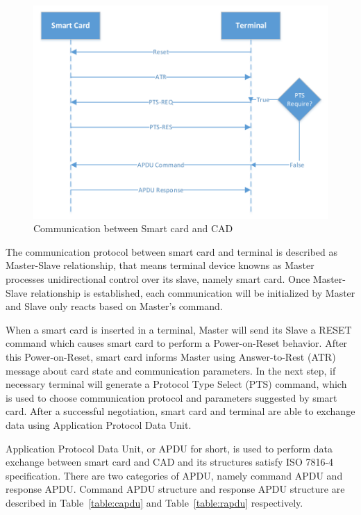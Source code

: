 \begin{figure}[!htbp]
	\centering
	\includegraphics[width=1.0\textwidth]{master-slave-relationship}
		\caption{Communication between Smart card and CAD\cite{handbuch}}
	\label{fig:master-slave-relationship}
\end{figure}
The communication protocol between smart card and terminal is described as Master-Slave relationship\cite{handbuch}, that means terminal device knowns as Master processes unidirectional control over its slave, namely smart card. Once Master-Slave relationship is established, each communication will be initialized by Master and Slave only reacts based on Master's command. 

When a smart card is inserted in a terminal, Master will send its Slave a RESET command which causes smart card to perform a Power-on-Reset behavior. After this Power-on-Reset, smart card informs Master using Answer-to-Rest (ATR) message about card state and communication parameters. In the next step, if necessary terminal will generate a Protocol Type Select (PTS) command, which is used to choose communication protocol and parameters suggested by smart card. After a successful negotiation, smart card and terminal are able to exchange data using Application Protocol Data Unit.
  
Application Protocol Data Unit, or APDU for short, is used  to perform data exchange between smart card and CAD and its structures satisfy ISO 7816-4 specification\cite{chen}. There are two categories of APDU, namely command APDU and response APDU. Command APDU structure and response APDU structure are described in Table~\ref{table:capdu} and Table~\ref{table:rapdu} respectively\cite{handbuch}. 

